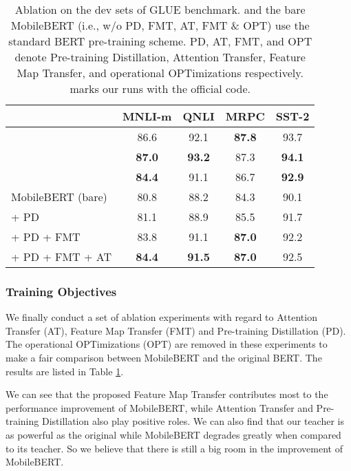 \documentclass[11pt,a4paper]{article}
\begin{document}
\setlength{\tabcolsep}{3pt}
\begin{table}[t]
\begin{center}
	    \small
		\begin{tabular}{l | c c c c}
			\hline
            & \textbf{MNLI-m} & \textbf{QNLI} & \textbf{MRPC} & \textbf{SST-2}\\
			\hline
			 & 86.6 & 92.1\dag & \textbf{87.8} & 93.7\\
			 & \textbf{87.0} & \textbf{93.2} & 87.3 & \textbf{94.1}\\
			\hline
			 & \textbf{84.4} & 91.1\dag & 86.7 & \textbf{92.9}\\
MobileBERT (bare)  & 80.8 & 88.2 & 84.3 & 90.1\\
			 \quad + PD & 81.1 & 88.9 & 85.5 & 91.7 \\
			 \quad + PD + FMT  & 83.8 & 91.1 & \textbf{87.0} & 92.2 \\
			 \quad + PD + FMT + AT & \textbf{84.4} & \textbf{91.5} & \textbf{87.0} & 92.5\\
\hline
		\end{tabular}
	\end{center}
	\caption[Caption for LOF]{Ablation on the dev sets of GLUE benchmark.   and the bare MobileBERT (i.e., w/o PD, FMT, AT, FMT \& OPT) use the standard BERT pre-training scheme. PD, AT, FMT, and OPT denote Pre-training Distillation, Attention Transfer, Feature Map Transfer, and operational OPTimizations respectively. \dag marks our runs with the official code. }
	\label{tab:ablation}
\end{table}
\setlength{\tabcolsep}{6pt}

\subsubsection{Training Objectives}\label{sec:ablation}





We finally conduct a set of ablation experiments with regard to Attention Transfer (AT), Feature Map Transfer (FMT) and Pre-training Distillation (PD). The operational OPTimizations (OPT) are removed in these experiments to make a fair comparison between MobileBERT and the original BERT. The results are listed in Table \ref{tab:ablation}.


We can see that the proposed Feature Map Transfer contributes most to the performance improvement of MobileBERT, while Attention Transfer and Pre-training Distillation also play positive roles.
We can also find that our  teacher is as powerful as the original  while MobileBERT degrades greatly when compared to its teacher. So we believe that there is still a big room in the improvement of MobileBERT.
\end{document}
